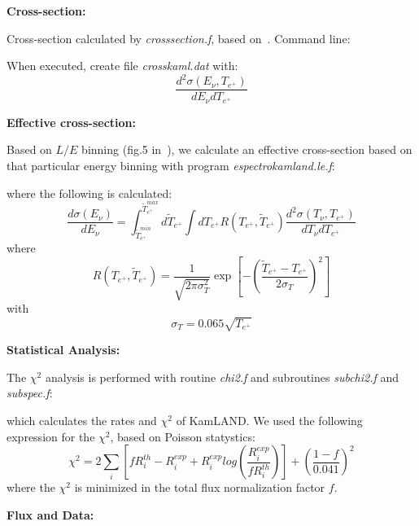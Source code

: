 \documentclass[12pt]{article}
\begin{document}
{\parindent=0pt \bf Cross-section:}
\vspace{0.5cm}

Cross-section calculated by {\it crosssection.f}, based on~\cite{Vogel:1999zy}.
Command line:

\begin{center}
\end{center}

When executed, create file {\it crosskaml.dat} with:
\[
\frac{d^2\sigma(E_\nu,T_{e^+})}{dE_\nu dT_{e^+}}
\]

\vspace{1cm}
{\parindent=0pt \bf Effective cross-section:}
\vspace{0.5cm}

Based on $L/E$ binning (fig.5 in~\cite{Gando:2010aa}), we calculate an
effective cross-section based on that particular energy binning with
program {\it espectrokamland.le.f}:
\begin{center}
\end{center}
where the following is calculated:
\[
\frac{d\sigma(E_\nu)}{dE_\nu}=
\int_{\tilde{T}_{e^+}^{min}}^{\tilde{T}_{e^+}^{max}} d\tilde{T}_{e^+}
\int dT_{e^+} R(T_{e^+},\tilde{T}_{e^+})
\frac{d^2\sigma(T_\nu,T_{e^+})}{dT_\nu dT_{e^+}}
\]
where
\[
R(T_{e^+},\tilde{T}_{e^+})=\frac{1}{\sqrt{2\pi\sigma_T^2}}
\exp{\left[-\left(\frac{\tilde{T}_{e^+}-T_{e^+}}{2\sigma_T}\right)^2\right]}
\]
with
\[
\sigma_T=0.065\sqrt{T_{e^+}}
\]

\vspace{1cm}
{\parindent=0pt \bf Statistical Analysis:}
\vspace{0.5cm}

The $\chi^2$ analysis is performed with routine {\it chi2.f} and subroutines
{\it subchi2.f} and {\it subspec.f}:
\begin{center}
\end{center}
which calculates the rates and $\chi^2$ of KamLAND. We used the following
expression for the $\chi^2$, based on Poisson statystics:
\[
\chi^2=2\sum_i\left[fR_i^{th}-R_i^{exp}+
R_i^{exp}log\left(\frac{R_i^{exp}}{fR_i^{th}}\right)\right] +
\left(\frac{1-f}{0.041}\right)^2
\]
where the $\chi^2$ is minimized in the total flux normalization factor $f$.

\vspace{1cm}
{\parindent=0pt \bf Flux and Data:}
\vspace{0.5cm}
\end{document}

